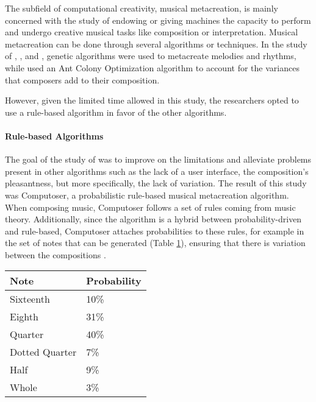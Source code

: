             The subfield of computational creativity, musical metacreation, is mainly concerned with the study of endowing or giving machines the capacity to perform and undergo creative musical tasks like composition or interpretation. Musical metacreation can be done through several algorithms or techniques. In the study of \citet{tokui2000music}, \citet{birchfield2003generative}, and \citet{kikuchi2014automatic}, genetic algorithms were used to metacreate melodies and rhythms, while \citet{geis2008creating} used an Ant Colony Optimization algorithm to account for the variances that composers add to their composition. 
            
            However, given the limited time allowed in this study, the researchers opted to use a rule-based algorithm in favor of the other algorithms.
        
        	\paragraph{Rule-based Algorithms}
            	
                The goal of the study of \citet{bozhanov2014computoser} was to improve on the limitations and alleviate problems present in other algorithms such as the lack of a user interface, the composition's pleasantness, but more specifically, the lack of variation. The result of this study was Computoser, a probabilistic rule-based musical metacreation algorithm. When composing music, Computoser follows a set of rules coming from music theory. Additionally, since the algorithm is a hybrid between probability-driven and rule-based, Computoser attaches probabilities to these rules, for example in the set of notes that can be generated (Table \ref{tab:cnp}), ensuring that there is variation between the compositions \citep{bozhanov2014computoser}. 


\begin{table} [!htbp]  
\centering
        \label{tab:cnp}
   \vspace{0.20cm}    
        \begin{tabular}{|p{4cm}|p{2cm}|} %
        \hline 
       Note & Probability \\ \hline
       Sixteenth & 10\% \\ \hline
       Eighth & 31\% \\ \hline
       Quarter & 40\% \\ \hline
       Dotted Quarter & 7\% \\ \hline
       Half & 9\% \\ \hline
       Whole & 3\% \\ \hline
        \end{tabular}
\end{table}

